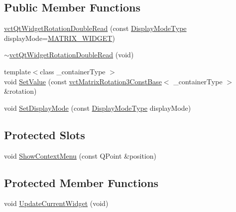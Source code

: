 \subsection*{Public Member Functions}
\begin{DoxyCompactItemize}
\item 
\hyperlink{classvct_qt_widget_rotation_double_read_a120fe39697d78152ac516e38d02d7357}{vct\+Qt\+Widget\+Rotation\+Double\+Read} (const \hyperlink{classvct_qt_widget_rotation_double_read_a77ae5a0ee5fe231ad2f9dd020aad434c}{Display\+Mode\+Type} display\+Mode=\hyperlink{classvct_qt_widget_rotation_double_read_a77ae5a0ee5fe231ad2f9dd020aad434cab4e7af571815b292da348c3526627d1e}{M\+A\+T\+R\+I\+X\+\_\+\+W\+I\+D\+G\+E\+T})
\item 
\hyperlink{classvct_qt_widget_rotation_double_read_a23e084ae43653d53fd20e85c6afe15cf}{$\sim$vct\+Qt\+Widget\+Rotation\+Double\+Read} (void)
\item 
{\footnotesize template$<$class \+\_\+container\+Type $>$ }\\void \hyperlink{classvct_qt_widget_rotation_double_read_a95a74bc313cea4a4a1d9db2d6fd49634}{Set\+Value} (const \hyperlink{classvct_matrix_rotation3_const_base}{vct\+Matrix\+Rotation3\+Const\+Base}$<$ \+\_\+container\+Type $>$ \&rotation)
\item 
void \hyperlink{classvct_qt_widget_rotation_double_read_a4ac3504e0f8622435ffbf4ded556294e}{Set\+Display\+Mode} (const \hyperlink{classvct_qt_widget_rotation_double_read_a77ae5a0ee5fe231ad2f9dd020aad434c}{Display\+Mode\+Type} display\+Mode)
\end{DoxyCompactItemize}
\subsection*{Protected Slots}
\begin{DoxyCompactItemize}
\item 
void \hyperlink{classvct_qt_widget_rotation_double_read_a94e6927e3694916be09be2c182bc5c37}{Show\+Context\+Menu} (const Q\+Point \&position)
\end{DoxyCompactItemize}
\subsection*{Protected Member Functions}
\begin{DoxyCompactItemize}
\item 
void \hyperlink{classvct_qt_widget_rotation_double_read_a23e91f048fc3893276985fdc13309a39}{Update\+Current\+Widget} (void)
\end{DoxyCompactItemize}
